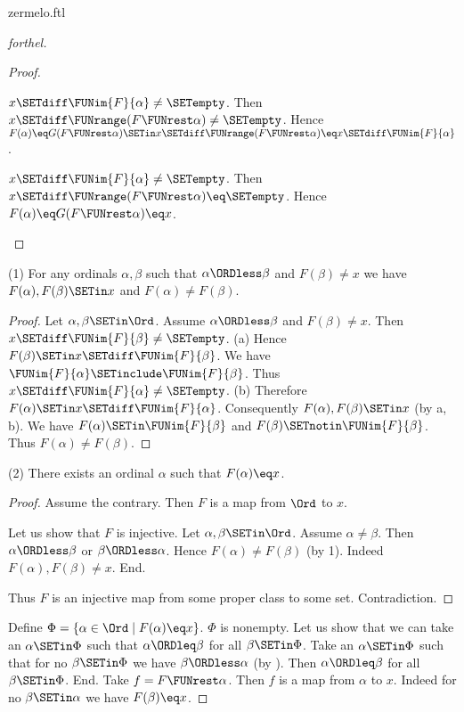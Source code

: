 \documentclass{naproche-library}
\begin{document}
\begin{smodule}[title=Zermelo's Well-Ordering Theorem]{zermelo.ftl}
\begin{proof}[forthel]
\begin{proof}
    \begin{case}{$x \SETdiff \FUNim{F}{\alpha} \neq \SETempty$.}
      Then $x \SETdiff \FUNrange(F \FUNrest \alpha) \neq \SETempty$.
      Hence $F(\alpha)
        \eq G(F \FUNrest \alpha)
        \SETin x \SETdiff \FUNrange(F \FUNrest \alpha)
        \eq x \SETdiff \FUNim{F}{\alpha}$.
    \end{case}

    \begin{case}{$x \SETdiff \FUNim{F}{\alpha} \neq \SETempty$.}
      Then $x \SETdiff \FUNrange(F \FUNrest \alpha) \eq \SETempty$.
      Hence $F(\alpha)
        \eq G(F \FUNrest \alpha)
        \eq x$.
    \end{case}
  \end{proof}

  (1) For any ordinals $\alpha, \beta$ such that $\alpha \ORDless \beta$ and $F(\beta) \neq x$ we have $F(\alpha), F(\beta) \SETin x$ and $F(\alpha) \neq F(\beta)$.
  \begin{proof}
    Let $\alpha, \beta \SETin \Ord$.
    Assume $\alpha \ORDless \beta$ and $F(\beta) \neq x$.
    Then $x \SETdiff \FUNim{F}{\beta} \neq \SETempty$.
    (a) Hence $F(\beta) \SETin x \SETdiff \FUNim{F}{\beta}$.
    We have $\FUNim{F}{\alpha} \SETinclude \FUNim{F}{\beta}$.
    Thus $x \SETdiff \FUNim{F}{\alpha} \neq \SETempty$.
    (b) Therefore $F(\alpha) \SETin x \SETdiff \FUNim{F}{\alpha}$.
    Consequently $F(\alpha), F(\beta) \SETin x$ (by a, b).
    We have $F(\alpha) \SETin \FUNim{F}{\beta}$ and $F(\beta) \SETnotin \FUNim{F}{\beta}$.
    Thus $F(\alpha) \neq F(\beta)$.
  \end{proof}

  (2) There exists an ordinal $\alpha$ such that $F(\alpha) \eq x$.
  \begin{proof}
    Assume the contrary.
    Then $F$ is a map from $\Ord$ to $x$.

    Let us show that $F$ is injective.
      Let $\alpha, \beta \SETin \Ord$.
      Assume $\alpha \neq \beta$.
      Then $\alpha \ORDless \beta$ or $\beta \ORDless \alpha$.
      Hence $F(\alpha) \neq F(\beta)$ (by 1).
      Indeed $F(\alpha), F(\beta) \neq x$.
    End.

    Thus $F$ is an injective map from some proper class to some set.
    Contradiction.
  \end{proof}

  Define $\Phi = \{ \alpha \in \Ord \mid F(\alpha) \eq x \}$.
  $\Phi$ is nonempty.
  Let us show that we can take an $\alpha \SETin \Phi$ such that $\alpha \ORDleq \beta$ for all $\beta \SETin \Phi$.
    Take an $\alpha \SETin \Phi$ such that for no $\beta \SETin \Phi$ we have $\beta \ORDless \alpha$ (by ).
    Then $\alpha \ORDleq \beta$ for all $\beta \SETin \Phi$.
  End.
  Take $f = F \FUNrest \alpha$.
  Then $f$ is a map from $\alpha$ to $x$.
  Indeed for no $\beta \SETin \alpha$ we have $F(\beta) \eq x$.


\end{proof}
\end{smodule}
\end{document}
